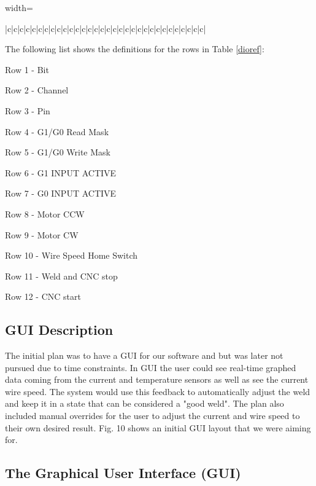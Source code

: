 \documentclass[12pt]{article}
\begin{document}
\begin{table}
\begin{center}
\begin{adjustbox}{width=\textwidth}
\begin{tabu}{ |c|c|c|c|c|c|c|c|c|c|c|c|c|c|c|c|c|c|c|c|c|c|c|c|c|c|c|c|c|c|c|c| }
\end{tabu}
\end{adjustbox}

\label{dioref}
\end{center}

\end{table}

The following list shows the definitions for the rows in Table \ref{dioref}:

\begin{itemize*}
		\item Row 1 - Bit
		\item Row 2 - Channel
		\item Row 3 - Pin
		\item Row 4 - G1/G0 Read Mask
		\item Row 5 - G1/G0 Write Mask
		\item Row 6 - G1 INPUT ACTIVE
		\item Row 7 - G0 INPUT ACTIVE
		\item Row 8 - Motor CCW
		\item Row 9 - Motor CW
		\item Row 10 - Wire Speed Home Switch
		\item Row 11 - Weld and CNC stop
		\item Row 12 - CNC start
\end{itemize*}

\clearpage



\subsection{GUI Description}

The initial plan was to have a GUI for our software and but was later not pursued due to time constraints. In GUI the user could see real-time graphed data coming from the current and temperature sensors as well as see the current wire speed. The system would use this feedback to automatically adjust the weld and keep it in a state that can be considered a "good weld". The plan also included manual overrides for the user to adjust the current and wire speed to their own desired result. Fig. 10 shows an initial GUI layout that we were aiming for.



\subsection{The Graphical User Interface (GUI)}
\end{document}
